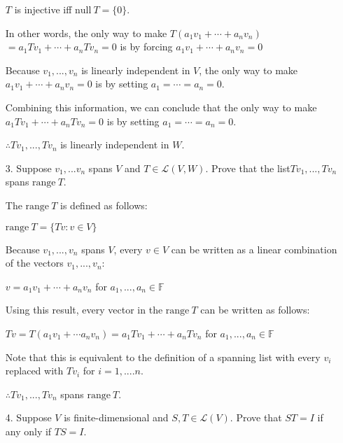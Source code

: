 \documentclass{article}
\begin{document}
\begin{enumerate}[nolistsep]
	$T$ is injective iff $\text{null}\ T = \{0\}$.
	
	In other words, the only way to make $T(a_1v_1 + \cdots + a_nv_n)$\newline$= a_1Tv_1 + \cdots + a_nTv_n = 0$ is by forcing $a_1v_1 + \cdots + a_nv_n = 0$ 
	
	Because $v_1,...,v_n$ is linearly independent in $V$, the only way to make $a_1v_1 + \cdots + a_nv_n = 0$ is by setting $a_1 = \cdots = a_n = 0$.
	
	Combining this information, we can conclude that the only way to make $a_1Tv_1 + \cdots + a_nTv_n = 0$ is by setting $a_1 = \cdots = a_n = 0$.
	
	$\therefore Tv_1,...,Tv_n$ is linearly independent in $W$.
	
		\item[3.] Suppose $v_1,...v_n$ spans $V$ and $T \in \mathcal{L}(V,W)$. Prove that the list\newline $Tv_1,...,Tv_n$ spans $\text{range}\ T$.

		The $\text{range}\ T$ is defined as follows:
		
		$\text{range}\ T = \{Tv : v \in V\}$
		
		Because $v_1,...,v_n$ spans $V$, every $v \in V$ can be written as a linear combination of the vectors $v_1,...,v_n$:
		
		$v = a_1v_1 + \cdots + a_nv_n$ for $a_1,...,a_n \in \mathbb{F}$
		
		Using this result, every vector in the $\text{range}\ T$ can be written as follows:
		
		$Tv = T(a_1v_1 + \cdots a_nv_n) = a_1Tv_1 + \cdots + a_nTv_n$ for $a_1,...,a_n \in \mathbb{F}$
		
		Note that this is equivalent to the definition of a spanning list with every $v_i$ replaced with $Tv_i$ for $i = 1,....n$.
		
		$\therefore Tv_1,...,Tv_n$ spans $\text{range}\ T$.
		
		\item[4.] Suppose $V$ is finite-dimensional and $S,T \in \mathcal{L}(V)$. Prove that $ST = I$ if any only if $TS = I$.
		
		
	\end{enumerate}
\end{document}
